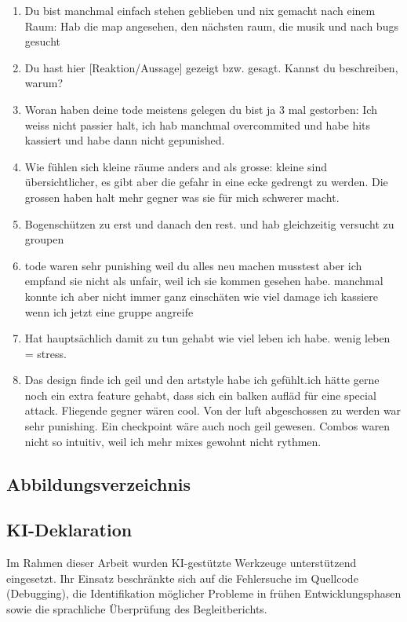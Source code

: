 \documentclass[../Main.tex]{subfiles}
\begin{document}
\begin{enumerate}[label=\textbf{Q\arabic*}, leftmargin=1.5cm, itemsep=0.5em]
\begin{enumerate}[label=\textbf{I\arabic*}, leftmargin=1.5cm, itemsep=0.5em]
    \item Du bist manchmal einfach stehen geblieben und nix gemacht nach einem Raum: Hab die map angesehen, den nächsten raum, die musik und nach bugs gesucht
    \item Du hast hier [Reaktion/Aussage] gezeigt bzw. gesagt. Kannst du beschreiben, warum?
    \item Woran haben deine tode meistens gelegen du bist ja 3 mal gestorben: Ich weiss nicht passier halt, ich hab manchmal overcommited und habe hits kassiert und habe dann nicht gepunished.
    \item Wie fühlen sich kleine räume anders and als grosse: kleine sind übersichtlicher, es gibt aber die gefahr in eine ecke gedrengt zu werden. Die grossen haben halt mehr gegner was sie für mich schwerer macht.
    \item Bogenschützen zu erst und danach den rest. und hab gleichzeitig versucht zu groupen
    \item tode waren sehr punishing weil du alles neu machen musstest aber ich empfand sie nicht als unfair, weil ich sie kommen gesehen habe. manchmal konnte ich aber nicht immer ganz einschäten wie viel damage ich kassiere wenn ich jetzt eine gruppe angreife
    \item Hat hauptsächlich damit zu tun gehabt wie viel leben ich habe. wenig leben = stress.
    \item Das design finde ich geil und den artstyle habe ich gefühlt.ich hätte gerne noch ein extra feature gehabt, dass sich ein balken aufläd für eine special attack. Fliegende gegner wären cool. Von der luft abgeschossen zu werden war sehr punishing. Ein checkpoint wäre auch noch geil gewesen. Combos waren nicht so intuitiv, weil ich mehr mixes gewohnt nicht rythmen.
\end{enumerate}


\subsection{Abbildungsverzeichnis}

\listoffigures

\subsection{KI-Deklaration}

Im Rahmen dieser Arbeit wurden KI-gestützte Werkzeuge unterstützend eingesetzt. Ihr Einsatz beschränkte sich auf die Fehlersuche im Quellcode (Debugging), die Identifikation möglicher Probleme in frühen Entwicklungsphasen sowie die sprachliche Überprüfung des Begleitberichts.


\end{enumerate}
\end{document}
